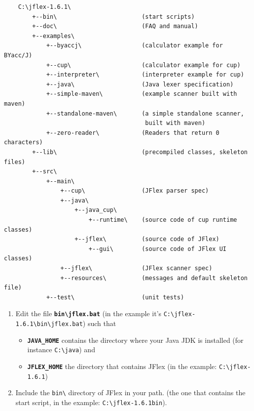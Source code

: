 \begin{verbatim}
    C:\jflex-1.6.1\ 
        +--bin\                        (start scripts) 
        +--doc\                        (FAQ and manual) 
        +--examples\ 
            +--byaccj\                 (calculator example for BYacc/J) 
            +--cup\                    (calculator example for cup) 
            +--interpreter\            (interpreter example for cup) 
            +--java\                   (Java lexer specification) 
            +--simple-maven\           (example scanner built with maven) 
            +--standalone-maven\       (a simple standalone scanner, 
                                        built with maven) 
            +--zero-reader\            (Readers that return 0 characters) 
        +--lib\                        (precompiled classes, skeleton files) 
        +--src\ 
            +--main\ 
                +--cup\                (JFlex parser spec) 
                +--java\ 
                    +--java_cup\ 
                        +--runtime\    (source code of cup runtime classes) 
                    +--jflex\          (source code of JFlex) 
                        +--gui\        (source code of JFlex UI classes) 
                +--jflex\              (JFlex scanner spec) 
                +--resources\          (messages and default skeleton file) 
            +--test\                   (unit tests)
\end{verbatim}

\begin{enumerate}
\def\labelenumi{\arabic{enumi}.}
\setcounter{enumi}{1}
\item
  Edit the file \textbf{\texttt{bin\textbackslash{}jflex.bat}} (in the
  example it's
  \texttt{C:\textbackslash{}jflex-1.6.1\textbackslash{}bin\textbackslash{}jflex.bat})
  such that

  \begin{itemize}
  \item
    \textbf{\texttt{JAVA\_HOME}} contains the directory where your Java
    JDK is installed (for instance \texttt{C:\textbackslash{}java}) and
  \item
    \textbf{\texttt{JFLEX\_HOME}} the directory that contains JFlex (in
    the example: \texttt{C:\textbackslash{}jflex-1.6.1})
  \end{itemize}
\item
  Include the \texttt{bin\textbackslash{}} directory of JFlex in your
  path. (the one that contains the start script, in the example:
  \texttt{C:\textbackslash{}jflex-1.6.1bin}).
\end{enumerate}

